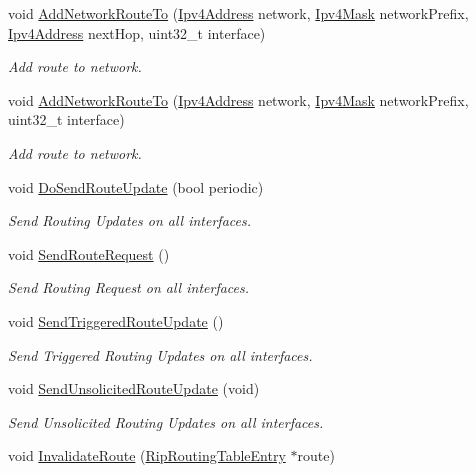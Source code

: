 \begin{DoxyCompactItemize}
\item 
void \hyperlink{classns3_1_1Rip_a8aa9415f65e5fb8abaa6af5c93446231}{Add\+Network\+Route\+To} (\hyperlink{classns3_1_1Ipv4Address}{Ipv4\+Address} network, \hyperlink{classns3_1_1Ipv4Mask}{Ipv4\+Mask} network\+Prefix, \hyperlink{classns3_1_1Ipv4Address}{Ipv4\+Address} next\+Hop, uint32\+\_\+t interface)
\begin{DoxyCompactList}\small\item\em Add route to network. \end{DoxyCompactList}\item 
void \hyperlink{classns3_1_1Rip_af107d4ee9156d769b699ba6939806025}{Add\+Network\+Route\+To} (\hyperlink{classns3_1_1Ipv4Address}{Ipv4\+Address} network, \hyperlink{classns3_1_1Ipv4Mask}{Ipv4\+Mask} network\+Prefix, uint32\+\_\+t interface)
\begin{DoxyCompactList}\small\item\em Add route to network. \end{DoxyCompactList}\item 
void \hyperlink{classns3_1_1Rip_a106f73869862c38c070faec379542e05}{Do\+Send\+Route\+Update} (bool periodic)
\begin{DoxyCompactList}\small\item\em Send Routing Updates on all interfaces. \end{DoxyCompactList}\item 
void \hyperlink{classns3_1_1Rip_a84c90e335d9b833b26f1a8e8e7fc2243}{Send\+Route\+Request} ()
\begin{DoxyCompactList}\small\item\em Send Routing Request on all interfaces. \end{DoxyCompactList}\item 
void \hyperlink{classns3_1_1Rip_aee5d3efe6b4dbcd128018f49b981fd7c}{Send\+Triggered\+Route\+Update} ()
\begin{DoxyCompactList}\small\item\em Send Triggered Routing Updates on all interfaces. \end{DoxyCompactList}\item 
void \hyperlink{classns3_1_1Rip_aea59ff20475f09e1783bc37d5a8531c0}{Send\+Unsolicited\+Route\+Update} (void)
\begin{DoxyCompactList}\small\item\em Send Unsolicited Routing Updates on all interfaces. \end{DoxyCompactList}\item 
void \hyperlink{classns3_1_1Rip_a48b295877e349360bf978c250ae59083}{Invalidate\+Route} (\hyperlink{classns3_1_1RipRoutingTableEntry}{Rip\+Routing\+Table\+Entry} $\ast$route)

\end{DoxyCompactItemize}
